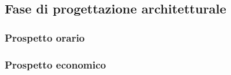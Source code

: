 \subsection{Fase di progettazione architetturale}
	\subsubsection{Prospetto orario}
	\subsubsection{Prospetto economico}